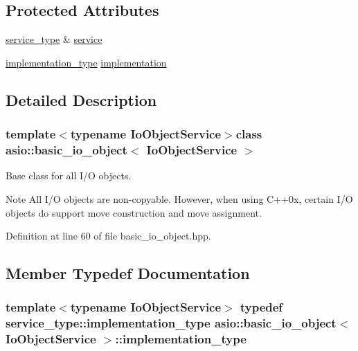 \subsection*{Protected Attributes}
\begin{DoxyCompactItemize}
\item 
\hyperlink{classasio_1_1basic__io__object_aee6c059b568e190966f1307cc21a264d}{service\+\_\+type} \& \hyperlink{classasio_1_1basic__io__object_a97608b43b051fbbb1254cda9ab2b5a56}{service}
\item 
\hyperlink{classasio_1_1basic__io__object_a36e6f136c8c1249242e81597c34d8d29}{implementation\+\_\+type} \hyperlink{classasio_1_1basic__io__object_a9fde7f7e9bdca995bdaec6213262e0c2}{implementation}
\end{DoxyCompactItemize}


\subsection{Detailed Description}
\subsubsection*{template$<$typename Io\+Object\+Service$>$class asio\+::basic\+\_\+io\+\_\+object$<$ Io\+Object\+Service $>$}

Base class for all I/\+O objects. 

\begin{DoxyNote}{Note}
All I/\+O objects are non-\/copyable. However, when using C++0x, certain I/\+O objects do support move construction and move assignment. 
\end{DoxyNote}


Definition at line 60 of file basic\+\_\+io\+\_\+object.\+hpp.



\subsection{Member Typedef Documentation}
\hypertarget{classasio_1_1basic__io__object_a36e6f136c8c1249242e81597c34d8d29}{}
\subsubsection[{implementation\+\_\+type}]{\setlength{\rightskip}{0pt plus 5cm}template$<$typename Io\+Object\+Service$>$ typedef service\+\_\+type\+::implementation\+\_\+type {\bf asio\+::basic\+\_\+io\+\_\+object}$<$ Io\+Object\+Service $>$\+::{\bf implementation\+\_\+type}}\label{classasio_1_1basic__io__object_a36e6f136c8c1249242e81597c34d8d29}


